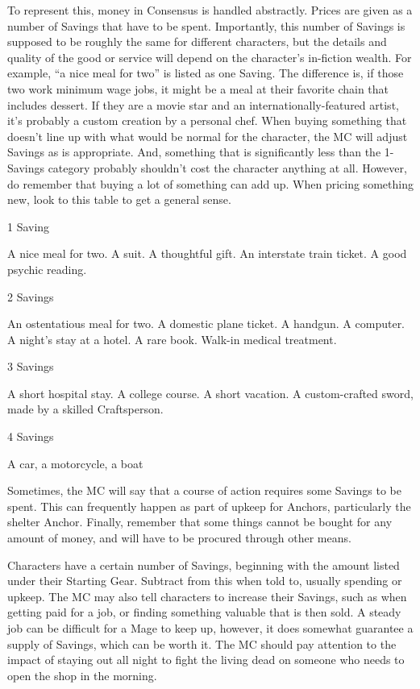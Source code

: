\documentclass[
]{article}
\begin{document}
To represent this, money in Consensus is handled abstractly. Prices are
given as a number of Savings that have to be spent. Importantly, this
number of Savings is supposed to be roughly the same for different
characters, but the details and quality of the good or service will
depend on the character's in-fiction wealth. For example, ``a nice meal
for two'' is listed as one Saving. The difference is, if those two work
minimum wage jobs, it might be a meal at their favorite chain that
includes dessert. If they are a movie star and an
internationally-featured artist, it's probably a custom creation by a
personal chef. When buying something that doesn't line up with what
would be normal for the character, the MC will adjust Savings as is
appropriate. And, something that is significantly less than the
1-Savings category probably shouldn't cost the character anything at
all. However, do remember that buying a lot of something can add up.
When pricing something new, look to this table to get a general sense.

1 Saving

A nice meal for two. A suit. A thoughtful gift. An interstate train
ticket. A good psychic reading.

2 Savings

An ostentatious meal for two. A domestic plane ticket. A handgun. A
computer. A night's stay at a hotel. A rare book. Walk-in medical
treatment.

3 Savings

A short hospital stay. A college course. A short vacation. A
custom-crafted sword, made by a skilled Craftsperson.

4 Savings

A car, a motorcycle, a boat

Sometimes, the MC will say that a course of action requires some Savings
to be spent. This can frequently happen as part of upkeep for Anchors,
particularly the shelter Anchor. Finally, remember that some things
cannot be bought for any amount of money, and will have to be procured
through other means.

Characters have a certain number of Savings, beginning with the amount
listed under their Starting Gear. Subtract from this when told to,
usually spending or upkeep. The MC may also tell characters to increase
their Savings, such as when getting paid for a job, or finding something
valuable that is then sold. A steady job can be difficult for a Mage to
keep up, however, it does somewhat guarantee a supply of Savings, which
can be worth it. The MC should pay attention to the impact of staying
out all night to fight the living dead on someone who needs to open the
shop in the morning.
\end{document}
